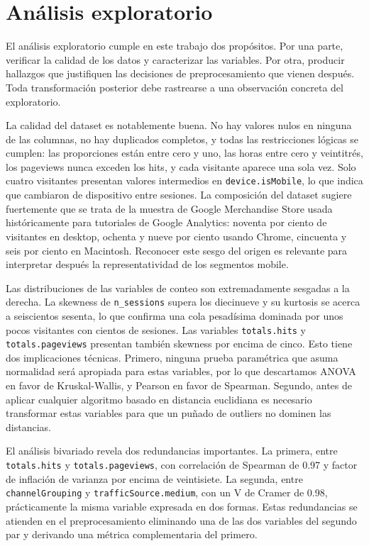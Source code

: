 \documentclass[11pt,a4paper]{article}
\begin{document}
\section{Análisis exploratorio}

El análisis exploratorio cumple en este trabajo dos propósitos. Por una parte,
verificar la calidad de los datos y caracterizar las variables. Por otra,
producir hallazgos que justifiquen las decisiones de preprocesamiento que vienen
después. Toda transformación posterior debe rastrearse a una observación concreta
del exploratorio.

La calidad del dataset es notablemente buena. No hay valores nulos en ninguna de
las columnas, no hay duplicados completos, y todas las restricciones lógicas se
cumplen: las proporciones están entre cero y uno, las horas entre cero y
veintitrés, los pageviews nunca exceden los hits, y cada visitante aparece una
sola vez. Solo cuatro visitantes presentan valores intermedios en
\texttt{device.isMobile}, lo que indica que cambiaron de dispositivo entre
sesiones. La composición del dataset sugiere fuertemente que se trata de la
muestra de Google Merchandise Store usada históricamente para tutoriales de
Google Analytics: noventa por ciento de visitantes en desktop, ochenta y nueve
por ciento usando Chrome, cincuenta y seis por ciento en Macintosh. Reconocer
este sesgo del origen es relevante para interpretar después la representatividad
de los segmentos mobile.

Las distribuciones de las variables de conteo son extremadamente sesgadas a la
derecha. La skewness de \texttt{n\_sessions} supera los diecinueve y su kurtosis
se acerca a seiscientos sesenta, lo que confirma una cola pesadísima dominada
por unos pocos visitantes con cientos de sesiones. Las variables \texttt{totals.hits}
y \texttt{totals.pageviews} presentan también skewness por encima de cinco. Esto
tiene dos implicaciones técnicas. Primero, ninguna prueba paramétrica que asuma
normalidad será apropiada para estas variables, por lo que descartamos ANOVA en
favor de Kruskal-Wallis, y Pearson en favor de Spearman. Segundo, antes de
aplicar cualquier algoritmo basado en distancia euclidiana es necesario
transformar estas variables para que un puñado de outliers no dominen las
distancias.

El análisis bivariado revela dos redundancias importantes. La primera, entre
\texttt{totals.hits} y \texttt{totals.pageviews}, con correlación de Spearman de
0.97 y factor de inflación de varianza por encima de veintisiete. La segunda,
entre \texttt{channelGrouping} y \texttt{trafficSource.medium}, con un V de
Cramer de 0.98, prácticamente la misma variable expresada en dos formas. Estas
redundancias se atienden en el preprocesamiento eliminando una de las dos
variables del segundo par y derivando una métrica complementaria del primero.
\end{document}
